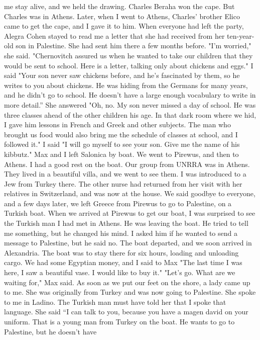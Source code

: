 me stay alive, and we held the drawing. Charles Beraha won the cape. But Charles was in 
Athens. Later, when I went to Athens, Charles' brother Elico came to get the 
cape, and I gave it to him. 
When everyone had left the party, Alegra Cohen stayed to read me a letter that she 
had received from her ten-year-old son in Palestine. She had sent him there a few months 
before. "I'm worried," she said. "Chernovitch assured us when he wanted to take our 
children that they would be sent to school. Here is a letter, talking only about chickens and eggs." 
I said "Your son never saw chickens before, and he's fascinated by them, so he 
writes to you about chickens. He was hiding from the Germans for many years, and he 
didn't go to school. He doesn't have a large enough vocabulary to write in more detail.”
She answered "Oh, no. My son never missed a day of school. He was three classes 
ahead of the other children his age. In that dark room where we hid, I gave him lessons in French and Greek and other subjects. The man who brought us food would also 
bring me the schedule of classes at school, and I followed it." 
I said "I will go myself to see your son. Give me the name of his kibbutz." 
Max and I left Salonica by boat. We went to Pirewus, and then to Athens. I had a 
good rest on the boat. Our group from UNRRA was in Athens. They lived in a beautiful 
villa, and we went to see them. I was introduced to a Jew from Turkey there. The other 
nurse had returned from her visit with her relatives in Switzerland, and was now at the 
house. We said goodbye to everyone, and a few days later, we left Greece from Pirewus 
to go to Palestine, on a Turkish boat. 
When we arrived at Pirewus to get our boat, I was surprised to see the Turkish man I 
had met in Athens. He was leaving the boat. He tried to tell me something, but he changed his mind. I asked him if he wanted to send a message to Palestine, but he said no. 
The boat departed, and we soon arrived in Alexandria. The boat was to stay there 
for six hours, loading and unloading cargo. We had some Egyptian money, and I said to 
Max "The last time I was here, I saw a beautiful vase. I would like to buy it." 
"Let's go. What are we waiting for," Max said. 
As soon as we put our feet on the shore, a lady came up to me. She was originally 
from Turkey and was now going to Palestine. She spoke to me in Ladino. The Turkish man 
must have told her that I spoke that language. 
She said “I can talk to you, because you have a magen david on your uniform. That
is a young man from Turkey on the boat. He wants to go to Palestine, but he doesn't have 
